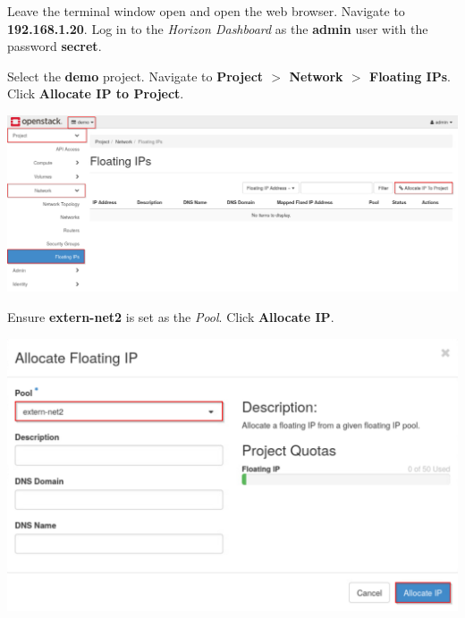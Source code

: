 \documentclass[letterpaper, 12pt]{article}
\begin{document}
\begin{enumerate}
    \begin{labstep}
        Leave the terminal window open and open the web browser.
        Navigate to \textbf{192.168.1.20}.
        Log in to the \textit{Horizon Dashboard} as the \textbf{admin} user with the password \textbf{secret}.
    \end{labstep}

    \begin{labstep}
        Select the \textbf{demo} project.
        Navigate to \textbf{Project $>$ Network $>$ Floating IPs}.
        Click \textbf{Allocate IP to Project}.

        \begin{center}
            \includegraphics[width=\linewidth]{images/part3/step4.png}
        \end{center}
    \end{labstep}

    \begin{labstep}
        Ensure \textbf{extern-net2} is set as the \textit{Pool}.
        Click \textbf{Allocate IP}.

        \begin{center}
            \includegraphics[width=\linewidth]{images/part3/step5.png}
        \end{center}
    \end{labstep}


\end{enumerate}
\end{document}
